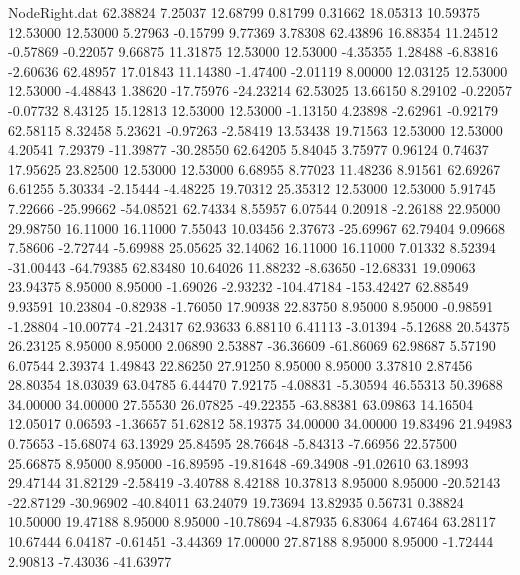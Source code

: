 \begin{filecontents}{NodeRight.dat}
  62.38824    7.25037   12.68799     0.81799    0.31662   18.05313   10.59375   12.53000   12.53000    5.27963   -0.15799    9.77369    3.78308
  62.43896   16.88354   11.24512    -0.57869   -0.22057    9.66875   11.31875   12.53000   12.53000   -4.35355    1.28488   -6.83816   -2.60636
  62.48957   17.01843   11.14380    -1.47400   -2.01119    8.00000   12.03125   12.53000   12.53000   -4.48843    1.38620  -17.75976  -24.23214
  62.53025   13.66150    8.29102    -0.22057   -0.07732    8.43125   15.12813   12.53000   12.53000   -1.13150    4.23898   -2.62961   -0.92179
  62.58115    8.32458    5.23621    -0.97263   -2.58419   13.53438   19.71563   12.53000   12.53000    4.20541    7.29379  -11.39877  -30.28550
  62.64205    5.84045    3.75977     0.96124    0.74637   17.95625   23.82500   12.53000   12.53000    6.68955    8.77023   11.48236    8.91561
  62.69267    6.61255    5.30334    -2.15444   -4.48225   19.70312   25.35312   12.53000   12.53000    5.91745    7.22666  -25.99662  -54.08521
  62.74334    8.55957    6.07544     0.20918   -2.26188   22.95000   29.98750   16.11000   16.11000    7.55043   10.03456    2.37673  -25.69967
  62.79404    9.09668    7.58606    -2.72744   -5.69988   25.05625   32.14062   16.11000   16.11000    7.01332    8.52394  -31.00443  -64.79385
  62.83480   10.64026   11.88232    -8.63650  -12.68331   19.09063   23.94375    8.95000    8.95000   -1.69026   -2.93232 -104.47184 -153.42427
  62.88549    9.93591   10.23804    -0.82938   -1.76050   17.90938   22.83750    8.95000    8.95000   -0.98591   -1.28804  -10.00774  -21.24317
  62.93633    6.88110    6.41113    -3.01394   -5.12688   20.54375   26.23125    8.95000    8.95000    2.06890    2.53887  -36.36609  -61.86069
  62.98687    5.57190    6.07544     2.39374    1.49843   22.86250   27.91250    8.95000    8.95000    3.37810    2.87456   28.80354   18.03039
  63.04785    6.44470    7.92175    -4.08831   -5.30594   46.55313   50.39688   34.00000   34.00000   27.55530   26.07825  -49.22355  -63.88381
  63.09863   14.16504   12.05017     0.06593   -1.36657   51.62812   58.19375   34.00000   34.00000   19.83496   21.94983    0.75653  -15.68074
  63.13929   25.84595   28.76648    -5.84313   -7.66956   22.57500   25.66875    8.95000    8.95000  -16.89595  -19.81648  -69.34908  -91.02610
  63.18993   29.47144   31.82129    -2.58419   -3.40788    8.42188   10.37813    8.95000    8.95000  -20.52143  -22.87129  -30.96902  -40.84011
  63.24079   19.73694   13.82935     0.56731    0.38824   10.50000   19.47188    8.95000    8.95000  -10.78694   -4.87935    6.83064    4.67464
  63.28117   10.67444    6.04187    -0.61451   -3.44369   17.00000   27.87188    8.95000    8.95000   -1.72444    2.90813   -7.43036  -41.63977

\end{filecontents}
